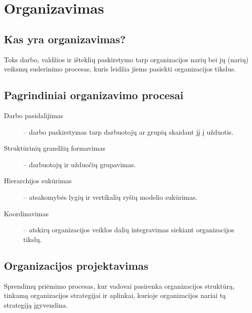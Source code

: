 \chapter{Organizavimas}

\section{Kas yra organizavimas?}

\begin{defn}[Organizavimas]
  Toks darbo, valdžios ir išteklių paskirstymo tarp organizacijos
  narių bei jų (narių) veiksmų suderinimo procesas, kuris leidžia jiems
  pasiekti organizacijos tikslus.
\end{defn}

\section{Pagrindiniai organizavimo procesai}

\begin{description}
  \item[Darbo pasidalijimas] – darbo paskirstymas tarp darbuotojų ar
    grupių skaidant jį į užduotis.
  \item[Struktūrinių grandžių formavimas] – darbuotojų ir
    užduočių grupavimas.
  \item[Hierarchijos sukūrimas] – atsakomybės lygių ir vertikalių
    ryšių modelio sukūrimas.
  \item[Koordinavimas] – atskirų organizacijos veiklos dalių integravimas
    siekiant organizacijos tikslų.
\end{description}

\section{Organizacijos projektavimas}

\begin{defn}
  Sprendimų priėmimo procesas, kur vadovai pasirenka organizacijos
  struktūrą, tinkamą organizacijos strategijai ir aplinkai, kurioje
  organizacijos nariai tą strategiją įgyvendina.
\end{defn}

